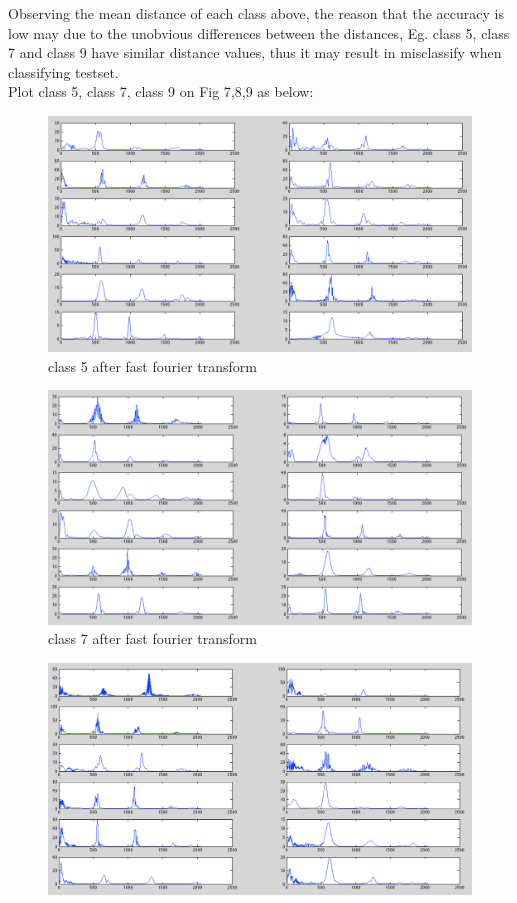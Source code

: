 \begin{enumerate}
\begin{table}[H]
\begin{tabular}{c c}
\hline
\end{tabular}
\end{table}

Observing the mean distance of each class above, the reason that the accuracy is low may due to the unobvious differences between the distances, Eg. class 5, class 7 and class 9 have similar distance values, thus it may result in misclassify when classifying testset.\\
Plot class 5, class 7, class 9 on Fig 7,8,9 as below:\\

\begin{figure}[H]
\includegraphics[scale=.4]{PIC/ffted_class5.png}
\caption{class 5 after fast fourier transform}
\end{figure}
\begin{figure}[H]
\includegraphics[scale=.4]{PIC/ffted_class7.png}
\caption{class 7 after fast fourier transform}
\end{figure}
\begin{figure}[H]
\includegraphics[scale=.4]{PIC/ffted_class9.png}

\end{figure}
\end{enumerate}
